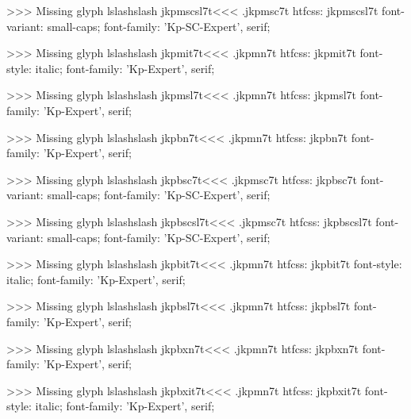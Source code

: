 >>>
Missing glyph	lslashslash
\<jkpmscsl7t\><<<
.jkpmsc7t
htfcss:  jkpmscsl7t  font-variant: small-caps; font-family: 'Kp-SC-Expert', serif;

>>>
Missing glyph	lslashslash
\<jkpmit7t\><<<
.jkpmn7t
htfcss:  jkpmit7t  font-style: italic; font-family: 'Kp-Expert', serif;

>>>
Missing glyph	lslashslash
\<jkpmsl7t\><<<
.jkpmn7t
htfcss:  jkpmsl7t  font-family: 'Kp-Expert', serif;

>>>
Missing glyph	lslashslash
\<jkpbn7t\><<<
.jkpmn7t
htfcss:  jkpbn7t  font-family: 'Kp-Expert', serif;

>>>
Missing glyph	lslashslash
\<jkpbsc7t\><<<
.jkpmsc7t
htfcss:  jkpbsc7t  font-variant: small-caps; font-family: 'Kp-SC-Expert', serif;

>>>
Missing glyph	lslashslash
\<jkpbscsl7t\><<<
.jkpmsc7t
htfcss:  jkpbscsl7t  font-variant: small-caps; font-family: 'Kp-SC-Expert', serif;

>>>
Missing glyph	lslashslash
\<jkpbit7t\><<<
.jkpmn7t
htfcss:  jkpbit7t  font-style: italic; font-family: 'Kp-Expert', serif;

>>>
Missing glyph	lslashslash
\<jkpbsl7t\><<<
.jkpmn7t
htfcss:  jkpbsl7t  font-family: 'Kp-Expert', serif;

>>>
Missing glyph	lslashslash
\<jkpbxn7t\><<<
.jkpmn7t
htfcss:  jkpbxn7t  font-family: 'Kp-Expert', serif;

>>>
Missing glyph	lslashslash
\<jkpbxit7t\><<<
.jkpmn7t
htfcss:  jkpbxit7t  font-style: italic; font-family: 'Kp-Expert', serif;

